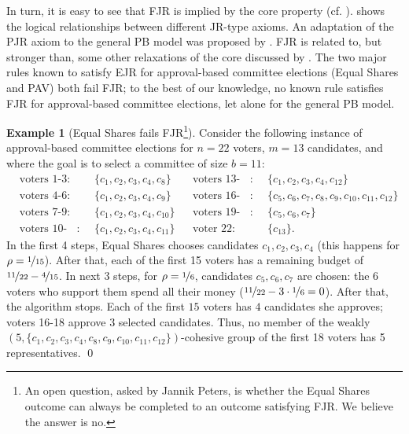 \documentclass[10pt]{scrartcl}
\theoremstyle{definition}
\newtheorem{example}{Example}
\theoremstyle{plain}
\begin{document}
In turn, it is easy to see that FJR is implied by the core property (cf. ).  shows the logical relationships between different JR-type axioms.
An adaptation of the PJR axiom to the general PB model was proposed by \citet{los2022systematization}.
FJR is related to, but stronger than, some other relaxations of the core discussed by \citet[Section~5.2]{pet-sko:laminar}.
The two major rules known to satisfy EJR for approval-based committee elections (Equal Shares and PAV) both fail FJR; to the best of our knowledge, no known rule satisfies FJR for approval-based committee elections, let alone for the general PB model.

\begin{example}[Equal Shares fails FJR\footnote{An open question, asked by Jannik Peters, is whether the Equal Shares outcome can always be completed to an outcome satisfying FJR. We believe the answer is no.}]\label{ex:rulex_no_strong_ejr}
Consider the following instance of approval-based committee elections for $n=22$ voters, $m = 13$ candidates, and where the goal is to select a committee of size $b=11$:
\begin{align*}
&\text{voters 1-3}\colon   &&\{c_1, c_2, c_3, c_4, c_8\}    && \text{voters 13-15}\colon && \{c_1, c_2, c_3, c_4, c_{12}\}\\
&\text{voters 4-6}\colon   &&\{c_1, c_2, c_3, c_4, c_9\}    && \text{voters 16-18}\colon && \{c_5, c_6, c_7, c_8, c_9, c_{10}, c_{11}, c_{12}\}\\
&\text{voters 7-9}\colon   &&\{c_1, c_2, c_3, c_4, c_{10}\} && \text{voters 19-21}\colon && \{c_5, c_6, c_7\}\\
&\text{voters 10-12}\colon &&\{c_1, c_2, c_3, c_4, c_{11}\} && \text{voter 22}\colon     && \{c_{13}\} \text{.}
\end{align*}
In the first 4 steps, Equal Shares chooses candidates $c_1, c_2, c_3, c_4$ (this happens for $\rho=\nicefrac{1}{15}$). After that, each of the first 15 voters has a remaining budget of  $\nicefrac{11}{22}-\nicefrac{4}{15}$. In next 3 steps, for $\rho=\nicefrac{1}{6}$, candidates $c_5, c_6, c_7$ are chosen: the 6 voters who support them spend all their money ($\nicefrac{11}{22} - 3 \cdot \nicefrac{1}{6} = 0$). After that, the algorithm stops. Each of the first $15$ voters has $4$ candidates she approves; voters 16-18 approve 3 selected candidates. Thus, no member of the weakly $(5,\{c_1, c_2, c_3, c_4,c_8, c_9, c_{10}, c_{11},c_{12}\})$-cohesive group of the first 18 voters has 5 representatives. \qed
\end{example}
\end{document}
